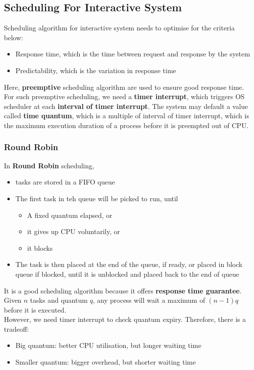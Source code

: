 \documentclass[11pt]{article}
\theoremstyle{definition}
\begin{document}
\subsection{Scheduling For Interactive System}
Scheduling algorithm for interactive system needs to optimise for the criteria below:
\begin{itemize}[itemsep=0pt]
\item Response time, which is the time between request and response by the system
\item Predictability, which is the variation in response time
\end{itemize} 
Here, \textbf{preemptive} scheduling algorithm are used to ensure good response time. For such preemptive scheduling, we need a \textbf{timer interrupt}, which triggers OS scheduler at each \textbf{interval of timer interrupt}. The system may default a value called \textbf{time quantum}, which is a multiple of interval of timer interrupt, which is the maximum execution duration of a process before it is preempted out of CPU.
\subsubsection{Round Robin}
In \textbf{Round Robin} scheduling, 
\begin{itemize}[itemsep=0pt]
  \item tasks are stored in a FIFO queue
  \item The first task in teh queue will be picked to run, until
  \begin{itemize}[itemsep=0pt]
  \item A fixed quantum elapsed, or
  \item it gives up CPU voluntarily, or
  \item it blocks
  \end{itemize}
  \item The task is then placed at the end of the queue, if ready, or placed in block queue if blocked, until it is unblocked and placed back to the end of queue
\end{itemize}
It is a good scheduling algorithm because it offers \textbf{response time guarantee}. Given $n$ tasks and quantum $q$, any process will wait a maximum of $(n-1)q$ before it is executed.\\
However, we need timer interrupt to check quantum expiry. Therefore, there is a tradeoff:
\begin{itemize}[itemsep=0pt]
  \item Big quantum: better CPU utilisation, but longer waiting time
  \item Smaller quantum: bigger overhead, but shorter waiting time
\end{itemize}
\end{document}
